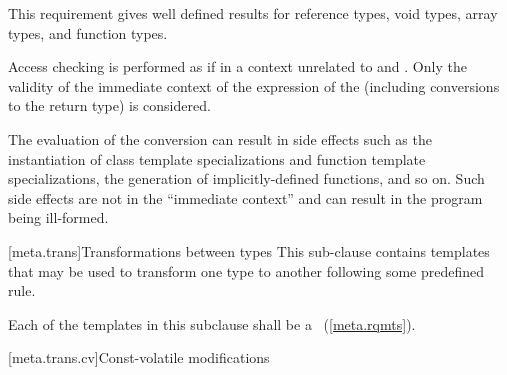 \begin{note} This requirement gives well defined results for reference types, void
types, array types, and function types.\end{note} Access checking is performed as
if in a context unrelated to  and . Only the validity of
the immediate context of the expression of the 
(including conversions to the return type) is considered. \begin{note} The
evaluation of the conversion can result in side effects such as the
instantiation of class template specializations and function template
specializations, the generation of implicitly-defined functions, and so on. Such
side effects are not in the ``immediate context'' and can result in the program
being ill-formed. \end{note}

[meta.trans]{Transformations between types}
\pnum
This sub-clause contains templates that may be used to transform one
type to another following some predefined rule.

\pnum
Each of the templates in this subclause shall be a
~(\ref{meta.rqmts}).

[meta.trans.cv]{Const-volatile modifications}

